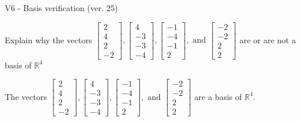 \begin{exercise}
  \begin{exerciseTitle}V6 - Basis verification (ver. 25)\end{exerciseTitle}
  \begin{exerciseStatement}
    Explain why the vectors \(\left[\begin{array}{r}
2 \\
4 \\
2 \\
-2
\end{array}\right] , \left[\begin{array}{r}
4 \\
-3 \\
-3 \\
-4
\end{array}\right] , \left[\begin{array}{r}
-1 \\
-4 \\
-1 \\
2
\end{array}\right] , \text{ and } \left[\begin{array}{r}
-2 \\
-2 \\
2 \\
2
\end{array}\right]\) are or are not a basis of \(\mathbb{R}^4\)	


  \end{exerciseStatement}
  \begin{exerciseAnswer}
   The vectors \(\left[\begin{array}{r}
2 \\
4 \\
2 \\
-2
\end{array}\right] , \left[\begin{array}{r}
4 \\
-3 \\
-3 \\
-4
\end{array}\right] , \left[\begin{array}{r}
-1 \\
-4 \\
-1 \\
2
\end{array}\right] , \text{ and } \left[\begin{array}{r}
-2 \\
-2 \\
2 \\
2
\end{array}\right]\) 
  	 are  a basis of \(\mathbb{R}^4\).
  


  \end{exerciseAnswer}
\end{exercise}